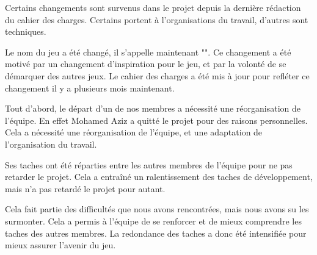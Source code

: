 
Certains changements sont survenus dans le projet depuis la dernière rédaction du cahier des charges. Certains portent à l'organisations du travail, d'autres sont techniques. 

Le nom du jeu a été changé, il s'appelle maintenant "\gameName". Ce changement a été motivé par un changement d'inspiration pour le jeu, et par la volonté de se démarquer des autres jeux. Le cahier des charges a été mis à jour pour refléter ce changement il y a plusieurs mois maintenant.

Tout d'abord, le départ d'un de nos membres a nécessité une réorganisation de l'équipe. En effet Mohamed Aziz a quitté le projet pour des raisons personnelles. Cela a nécessité une réorganisation de l'équipe, et une adaptation de l'organisation du travail.

Ses taches ont été réparties entre les autres membres de l'équipe pour ne pas retarder le projet. Cela a entraîné un ralentissement des taches de développement, mais n'a pas retardé le projet pour autant.

Cela fait partie des difficultés que nous avons rencontrées, mais nous avons su les surmonter. Cela a permis à l'équipe de se renforcer et de mieux comprendre les taches des autres membres. La redondance des taches a donc été intensifiée pour mieux assurer l'avenir du jeu.